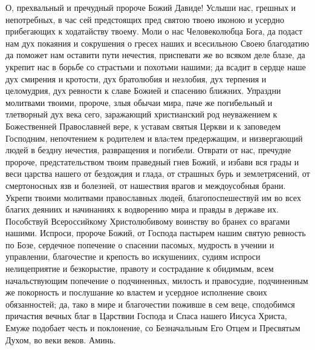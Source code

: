 \begin{mymulticols}
О, прехвальный и пречудный пророче Божий Давиде! Услыши нас, грешных и непотребных, в час сей предстоящих пред святою твоею иконою и усердно прибегающих к ходатайству твоему. Моли о нас Человеколюбца Бога, да подаст нам дух покаяния и сокрушения о гресех наших и всесильною Своею благодатию да поможет нам оставити пути нечестия, приспевати же во всяком деле блазе, да укрепит нас в борьбе со страстьми и похотьми нашими; да всадит в сердце наше дух смирения и кротости, дух братолюбия и незлобия, дух терпения и целомудрия, дух ревности к славе Божией и спасению ближних. Упраздни молитвами твоими, пророче, злыя обычаи мира, паче же погибельный и тлетворный дух века сего, заражающий христианский род неуважением к Божественней Православней вере, к уставам святыя Церкви и к заповедем Господним, непочтением к родителем и влаcтем предержащим, и низвергающий людей в бездну нечестия, развращения и погибели. Отврати от нас, пречудне пророче, предстательством твоим праведный гнев Божий, и избави вся грады и веси царства нашего от бездождия и глада, от страшных бурь и землетрясений, от смертоносных язв и болезней, от нашествия врагов и междоусобныя брани. Укрепи твоими молитвами православных людей, благопоспешествуй им во всех благих деяниих и начинаниях к водворению мира и правды в державе их. Пособствуй Всероссийкому Христолюбивому воинству во бранех со врагами нашими. Испроси, пророче Божий, от Господа пастырем нашим святую ревность по Бозе, сердечное попечение о спасении пасомых, мудрость в учении и управлении, благочестие и крепость во искушениих, судиям испроси нелицеприятие и безкорыстие, правоту и сострадание к обидимым, всем начальствующим попечение о подчиненных, милость и правосудие, подчиненным же покорность и послушание ко властем и усердное исполнение своих обязанностей; да, тако в мире и благочестии поживше в сем веце, сподобимся причастия вечных благ в Царствии Господа и Спаса нашего Иисуса Христа, Емуже подобает честь и поклонение, со Безначальным Его Отцем и Пресвятым Духом, во веки веков. Аминь.

\end{mymulticols}

